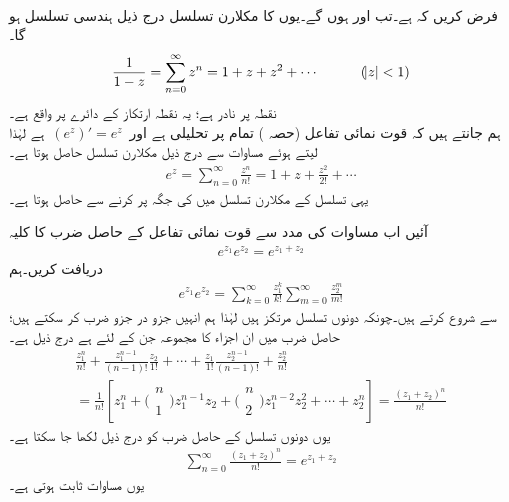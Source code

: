 %
\quad {}\\
فرض کریں کہ  ہے۔تب  اور  ہوں گے۔یوں  کا مکلارن تسلسل درج ذیل ہندسی تسلسل ہو گا۔
\begin{align}\label{مساوات_ٹیلر_ہندسی_تسلسل_مثال}
\frac{1}{1-z}=\sum\limits_{n=0}^{\infty} z^n=1+z+z^2+\cdots \quad \quad \quad (\abs{z}<1)
\end{align}
 نقطہ  پر نادر ہے؛ یہ نقطہ ارتکاز کے دائرے پر واقع ہے۔
\quad {}\\
ہم جانتے ہیں کہ قوت نمائی تفاعل  (حصہ ) تمام  پر تحلیلی ہے اور 
$\,(e^z)'=e^z\,$
ہے لہٰذا  لیتے ہوئے مساوات  سے درج ذیل مکلارن تسلسل حاصل ہوتا ہے۔
\begin{align}\label{مساوات_ٹیلر_قوت_نمائی_مکلارن_تسلسل}
e^z=\sum\limits_{n=0}^{\infty} \frac{z^n}{n!}=1+z+\frac{z^2}{2!}+\cdots
\end{align}
یہی تسلسل  کے مکلارن تسلسل میں  کی جگہ  پر کرنے سے حاصل ہوتا ہے۔

آئیں اب مساوات  کی مدد سے قوت نمائی تفاعل کے حاصل ضرب کا کلیہ
\begin{align}\label{مساوات_ٹیلر_قوت_نمائی_حاصل_ضرب}
e^{z_1}e^{z_2}=e^{z_1+z_2}
\end{align}
دریافت کریں۔ہم
\begin{align*}
e^{z_1}e^{z_2}=\sum\limits_{k=0}^{\infty} \frac{z_1^k}{k!}\sum\limits_{m=0}^{\infty}\frac{z_2^m}{m!}
\end{align*}
سے شروع کرتے ہیں۔چونکہ دونوں تسلسل مرتکز ہیں لہٰذا ہم انہیں جزو در جزو ضرب کر سکتے ہیں؛حاصل ضرب میں ان  اجزاء کا مجموعہ جن کے لئے  ہے درج ذیل ہے۔
\begin{multline*}
\frac{z_1^n}{n!}+\frac{z_1^{n-1}}{(n-1)!}\frac{z_2}{1!}+\cdots+\frac{z_1}{1!}\frac{z_2^{n-1}}{(n-1)!}+\frac{z_2^n}{n!}\\
=\frac{1}{n!}[z_1^n+\big(\begin{smallmatrix} n\\  \\1 \end{smallmatrix}\big)z_1^{n-1}z_2+\big(\begin{smallmatrix}n\\  \\2  \end{smallmatrix}\big)z_1^{n-2}z_2^2+\cdots+z_2^n]=\frac{(z_1+z_2)^n}{n!}
\end{multline*}
یوں دونوں تسلسل کے حاصل ضرب کو درج ذیل لکھا جا سکتا ہے۔
\begin{align*}
\sum\limits_{n=0}^{\infty}\frac{(z_1+z_2)^n}{n!}=e^{z_1+z_2}
\end{align*}
یوں مساوات  ثابت ہوتی ہے۔

